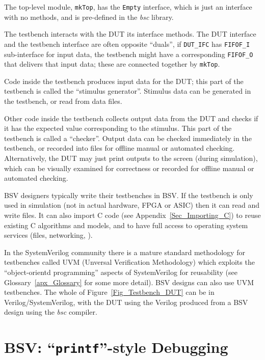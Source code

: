 The top-level module, \verb|mkTop|, has the \verb|Empty| interface,
which is just an interface with no methods, and is pre-defined in the
\emph{bsc} library.

The testbench interacts with the DUT {\via} its interface methods.
The DUT interface and the testbench interface are often opposite
``duals'', {\eg} if \verb|DUT_IFC| has \verb|FIFOF_I| sub-interface
for input data, the testbench might have a corresponding
\verb|FIFOF_O| that delivers that input data; these are connected
together by \verb|mkTop|.

Code inside the testbench produces input data for the DUT; this part
of the testbench is called the ``stimulus generator''.  Stimulus data
can be generated in the testbench, or read from data files.

Other code inside the testbench collects output data from the DUT and
checks if it has the expected value corresponding to the stimulus.
This part of the testbench is called a ``checker''.  Output data can
be checked immediately in the testbench, or recorded into files for
offline manual or automated checking.  Alternatively, the DUT may just
print outputs to the screen (during simulation), which can be visually
examined for correctness or recorded for offline manual or automated
checking.

BSV designers typically write their testbenches in BSV.  If the
testbench is only used in simulation (not in actual hardware, FPGA or
ASIC) then it can read and write files.  It can also import C code
(see Appendix~\ref{Sec_Importing_C}) to reuse existing C algorithms
and models, and to have full access to operating system services
(files, networking, {\etc}).

In the SystemVerilog community there is a mature standard methodology
for testbenches called UVM (Unversal Verification Methodology) which
exploits the ``object-orientd programming'' aspects of SystemVerilog
for reusability (see Glossary~\ref{apx_Glossary} for some more
detail).  BSV designs can also use UVM testbenches.  The whole of
Figure~\ref{Fig_Testbench_DUT} can be in Verilog/SystemVerilog, with
the DUT using the Verilog produced from a BSV design using the
\emph{bsc} compiler.


\section{BSV: ``{\tt printf}''-style Debugging}


